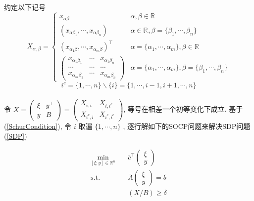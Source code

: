 \documentclass[a4paper, UTF8]{ctexart}				%
\numberwithin{equation}{section}				%
\begin{document}
			\paragraph{}
				\quad 约定以下记号
				\begin{equation}
						X_{\alpha, \beta}
					=
					\begin{cases}
						x_{\alpha \beta}
							&\alpha, \beta \in \mathbb{R}^{}\\
						(x_{\alpha \beta_1}, \cdots, x_{\alpha \beta_n})
							&\alpha \in \mathbb{R}^{}, \beta = \{\beta_1, \cdots, \beta_n\}\\
						(x_{\alpha_1 \beta}, \cdots, x_{\alpha_m \beta})^\top
							&\alpha = \{\alpha_1, \cdots, \alpha_m\}, \beta \in \mathbb{R}^{}\\
						\begin{pmatrix}
							x_{\alpha_1 \beta_1} & \cdots & x_{\alpha_1 \beta_n} \\
							\cdots & \cdots & \cdots\\
							x_{\alpha_m \beta_1} & \cdots & x_{\alpha_m \beta_n}
						\end{pmatrix}
							&\alpha = \{\alpha_1, \cdots, \alpha_m\}, \beta = \{\beta_1, \cdots, \beta_n\}
					\end{cases}
				\end{equation}
				\begin{equation}
						i^c
					=	\{1, \cdots, n\} \backslash \{i\}
					=	\{1, \cdots, i-1, i+1, \cdots, n\}
				\end{equation}

			\paragraph{}
				\quad 令
				$
						X
					=	\begin{pmatrix}
							\xi & y^\top \\
							y & B
						\end{pmatrix}
					=	\begin{pmatrix}
							X_{i, i} & X_{i, i^c} \\
							X_{i^c, i} & X_{i^c, i^c}
						\end{pmatrix}
				$,
				等号在相差一个初等变化下成立. 基于(\ref{SchurCondition}), 令 $i$ 取遍 $\{1, \cdots, n\}$ , 逐行解如下的SOCP问题来解决SDP问题(\ref{SDP})

				\begin{equation}
					\begin{split}\label{SOCP}
						\min_{[\xi; y] \in \mathbb{R}^{n}} \quad
							& \bar{c}^\top \begin{pmatrix}\xi \\ y\end{pmatrix}\\
						\text{s.t.} \quad
							& \bar{A} \begin{pmatrix}\xi \\ y\end{pmatrix} = \bar{b}\\
							& (X/B) \geq \delta
					\end{split}
				\end{equation}
\end{document}
